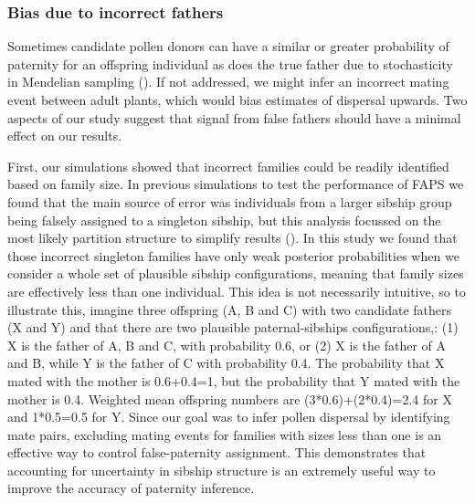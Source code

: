 \documentclass[10pt, a4paper, twocolumn]{article} %
\begin{document}
\subsubsection{Bias due to incorrect fathers}

Sometimes candidate pollen donors can have a similar or greater probability of paternity for an offspring individual as does the true father due to stochasticity in Mendelian sampling (\cite{thompson1976paradox}).
If not addressed, we might infer an incorrect mating event between adult plants, which would bias estimates of dispersal upwards.
Two aspects of our study suggest that signal from false fathers should have a minimal effect on our results.

First, our simulations showed that incorrect families could be readily identified based on family size.
In previous simulations to test the performance of FAPS we found that the main source of error was individuals from a larger sibship group being falsely assigned to a singleton sibship, but this analysis focussed on the most likely partition structure to simplify results (\cite{ellis2018efficient}).
In this study we found that those incorrect singleton families have only weak posterior probabilities when we consider a whole set of plausible sibship configurations, meaning that family sizes are effectively less than one individual.
This idea is not necessarily intuitive, so to illustrate this, imagine three offspring (A, B and C) with two candidate fathers (X and Y) and that there are two plausible paternal-sibships configurations,: (1) X is the father of A, B and C, with probability 0.6, or (2) X is the father of A and B, while Y is the father of C with probability 0.4.
The probability that X mated with the mother is 0.6+0.4=1, but the probability that Y mated with the mother is 0.4.
Weighted mean offspring numbers are (3*0.6)+(2*0.4)=2.4 for X and 1*0.5=0.5 for Y.
Since our goal was to infer pollen dispersal by identifying mate pairs, excluding mating events for families with sizes less than one is an effective way to control false-paternity assignment.
This demonstrates that accounting for uncertainty in sibship structure is an extremely useful way to improve the accuracy of paternity inference.
\end{document}
